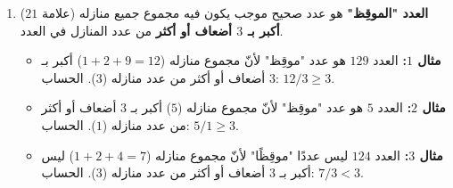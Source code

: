 \documentclass[14pt]{extarticle}
\begin{document}
\begin{enumerate}[label=\textbf{السؤال \arabic*:}, wide=0pt, itemsep=2.2em]




\item ($21$ علامة) \textbf{العدد "الموقِظ"} هو عدد صحيح موجب يكون فيه مجموع جميع منازله \textbf{أكبر بـ $3$ أضعاف أو أكثر} من عدد المنازل في العدد.
\begin{itemize}
\item \textbf{مثال $1$:} العدد $129$ هو عدد "موقِظ" لأنّ مجموع منازله ($1 + 2 + 9 = 12$) أكبر بـ $3$ أضعاف أو أكثر من عدد منازله ($3$). الحساب: $12 / 3 \geq 3$.
\item \textbf{مثال $2$:} العدد $5$ هو عدد "موقِظ" لأنّ مجموع منازله ($5$) أكبر بـ $3$ أضعاف أو أكثر من عدد منازله ($1$). الحساب: $5 / 1 \geq 3$.
\item \textbf{مثال $3$:} العدد $124$ ليس عددًا "موقِظًا" لأنّ مجموع منازله ($1 + 2 + 4 = 7$) ليس أكبر بـ $3$ أضعاف أو أكثر من عدد منازله ($3$). الحساب: $7 / 3 < 3$.
\end{itemize}


\end{enumerate}
\end{document}
